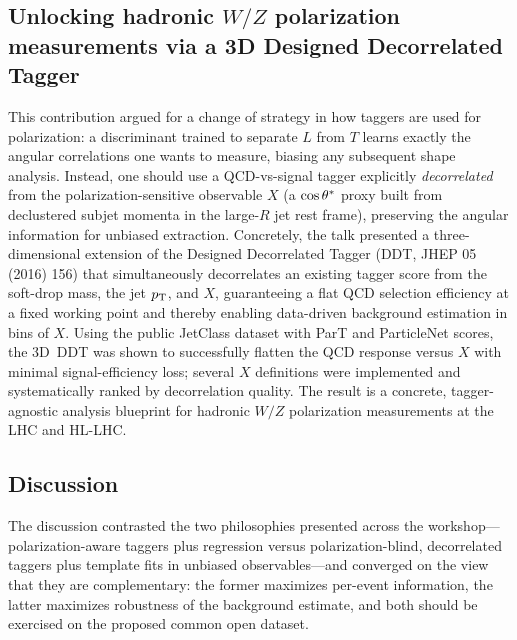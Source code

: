 \subsection{Unlocking hadronic $W/Z$ polarization measurements via a 3D Designed Decorrelated Tagger}
This contribution argued for a change of strategy in how taggers are used for
polarization: a discriminant trained to separate $L$ from $T$ learns exactly
the angular correlations one wants to measure, biasing any subsequent shape
analysis. Instead, one should use a QCD-vs-signal tagger explicitly
\emph{decorrelated} from the polarization-sensitive observable $X$ (a
$\cos\theta^{*}$ proxy built from declustered subjet momenta in the large-$R$ jet rest
frame), preserving the angular information for unbiased extraction. Concretely,
the talk presented a three-dimensional extension of the Designed Decorrelated
Tagger (DDT, JHEP 05 (2016) 156) that simultaneously decorrelates an existing
tagger score from the soft-drop mass, the jet $p_{\mathrm{T}}$, and $X$, guaranteeing a
flat QCD selection efficiency at a fixed working point and thereby enabling
data-driven background estimation in bins of $X$. Using the public JetClass
dataset with ParT and ParticleNet scores, the 3D~DDT was shown to successfully
flatten the QCD response versus $X$ with minimal signal-efficiency loss;
several $X$ definitions were implemented and systematically ranked by
decorrelation quality. The result is a concrete, tagger-agnostic analysis
blueprint for hadronic $W/Z$ polarization measurements at the LHC and HL-LHC.

\subsection{Discussion}
The discussion contrasted the two philosophies presented across the
workshop---polarization-aware taggers plus regression versus
polarization-blind, decorrelated taggers plus template fits in unbiased
observables---and converged on the view that they are complementary: the
former maximizes per-event information, the latter maximizes robustness of the
background estimate, and both should be exercised on the proposed common open
dataset.
